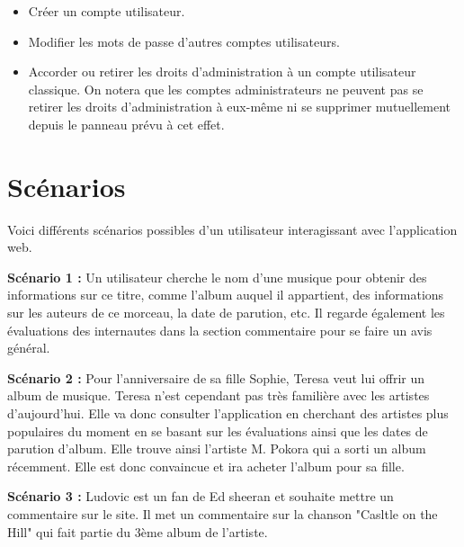\begin{paragraphe}
            \vspace{1em}
            \begin{itemize}
                \item Créer un compte utilisateur.
                \item Modifier les mots de passe d'autres comptes utilisateurs.
                \item Accorder ou retirer les droits d'administration à un compte utilisateur classique.
                On notera que les comptes administrateurs ne peuvent pas se retirer les droits 
                d'administration à eux-même ni se supprimer mutuellement depuis le panneau prévu à cet effet.
            \end{itemize}
        \end{paragraphe}

\section{Scénarios}

    \begin{paragraphe}
        Voici différents scénarios possibles d'un utilisateur interagissant avec
        l'application web.
    \end{paragraphe}

    \begin{paragraphe}
        \textbf{Scénario 1 :}
        Un utilisateur cherche le nom d'une musique pour obtenir des informations
        sur ce titre, comme l'album auquel il appartient, des informations sur les
        auteurs de ce morceau, la date de parution, etc. Il regarde également les évaluations
        des internautes dans la section commentaire pour se faire un avis général.
    \end{paragraphe}

    \begin{paragraphe}
        \textbf{Scénario 2 :}
        Pour l'anniversaire de sa fille Sophie, Teresa veut lui offrir un album de
        musique. Teresa n'est cependant pas très familière avec les artistes
        d'aujourd'hui. Elle va donc consulter l'application en cherchant des
        artistes plus populaires du moment en se basant sur les évaluations ainsi que les dates de parution d'album. 
        Elle trouve ainsi l'artiste M. Pokora qui a sorti un album récemment. Elle est donc convaincue et ira
        acheter l'album pour sa fille.
    \end{paragraphe}

    \begin{paragraphe}
        \textbf{Scénario 3 :}
        Ludovic est un fan de Ed sheeran et souhaite mettre un commentaire sur le
        site.
        Il met un commentaire sur la chanson "Casltle on the Hill" qui fait partie
        du 3ème album de l'artiste.
    \end{paragraphe}

